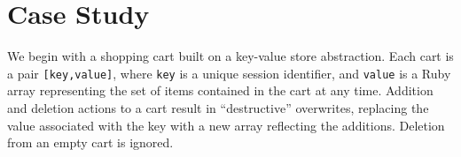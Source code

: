 \section{Case Study}
\label{sec:case}

We begin with a shopping cart built on a key-value store abstraction.  Each
cart is a pair \texttt{[key,value]}, where \texttt{key} is a unique session
identifier, and \texttt{value} is a Ruby array representing the set of items
contained in the cart at any time.  Addition and deletion actions to a cart
result in ``destructive'' overwrites, replacing the value associated with the
key with a new array reflecting the additions.  Deletion from an empty cart
 is ignored. 

